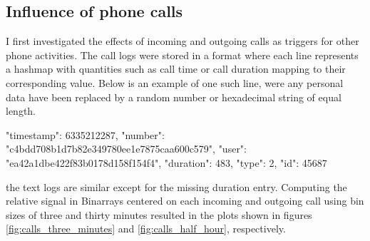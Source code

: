\subsection{Influence of phone calls}
\label{sec:trigger_phone}
I first investigated the effects of incoming and outgoing calls as triggers for other phone activities. The call logs were stored in a format where each line represents a hashmap with quantities such as call time or call duration mapping to their corresponding value. Below is an example of one such line, were any personal data have been replaced by a random number or hexadecimal string of equal length.
\begin{snippet}
	{
		"timestamp": 6335212287, 
		"number": "c4bdd708b1d7b82e349780ee1e7875caa600c579", 
		"user": "ea42a1dbe422f83b0178d158f154f4", 
		"duration": 483, 
		"type": 2, 
		"id": 45687
	}
\end{snippet}
the text logs are similar except for the missing duration entry. Computing the relative signal in Binarrays centered on each incoming and outgoing call using bin sizes of three and thirty minutes resulted in the plots shown in figures \ref{fig:calls_three_minutes} and \ref{fig:calls_half_hour}, respectively.
